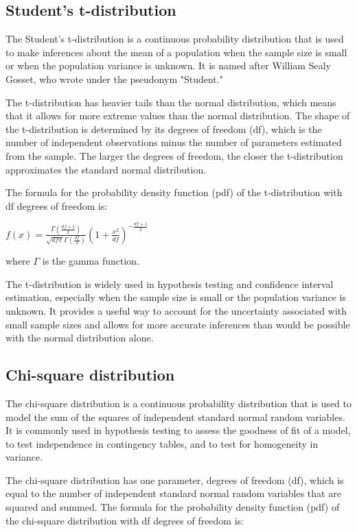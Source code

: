 \documentclass[12pt, a4paper, oneside]{article}
\begin{document}
\subsection{ Student’s t-distribution }
The Student's t-distribution is a continuous probability distribution that is used to make inferences about the mean of a population when the sample size is small or when the population variance is unknown. It is named after William Sealy Gosset, who wrote under the pseudonym "Student."

The t-distribution has heavier tails than the normal distribution, which means that it allows for more extreme values than the normal distribution. The shape of the t-distribution is determined by its degrees of freedom (df), which is the number of independent observations minus the number of parameters estimated from the sample. The larger the degrees of freedom, the closer the t-distribution approximates the standard normal distribution.

The formula for the probability density function (pdf) of the t-distribution with df degrees of freedom is:

$f(x) = \frac{\Gamma(\frac{df + 1}{2})}{\sqrt{df \pi} \Gamma(\frac{df}{2})} (1 + \frac{x^2}{df})^{-\frac{df + 1}{2}}$

where $\Gamma$ is the gamma function.

The t-distribution is widely used in hypothesis testing and confidence interval estimation, especially when the sample size is small or the population variance is unknown. It provides a useful way to account for the uncertainty associated with small sample sizes and allows for more accurate inferences than would be possible with the normal distribution alone.
\subsection{ Chi-square distribution }
The chi-square distribution is a continuous probability distribution that is used to model the sum of the squares of independent standard normal random variables. It is commonly used in hypothesis testing to assess the goodness of fit of a model, to test independence in contingency tables, and to test for homogeneity in variance.

The chi-square distribution has one parameter, degrees of freedom (df), which is equal to the number of independent standard normal random variables that are squared and summed. The formula for the probability density function (pdf) of the chi-square distribution with df degrees of freedom is:
\end{document}
